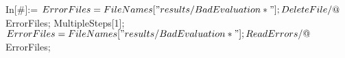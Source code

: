 In[#]:= $ErrorFiles = FileNames["results/BadEvaluation * "]; DeleteFile /@ $ErrorFiles; MultipleSteps[1]; $ErrorFiles = FileNames["results/BadEvaluation * "]; ReadErrors /@ $ErrorFiles; 